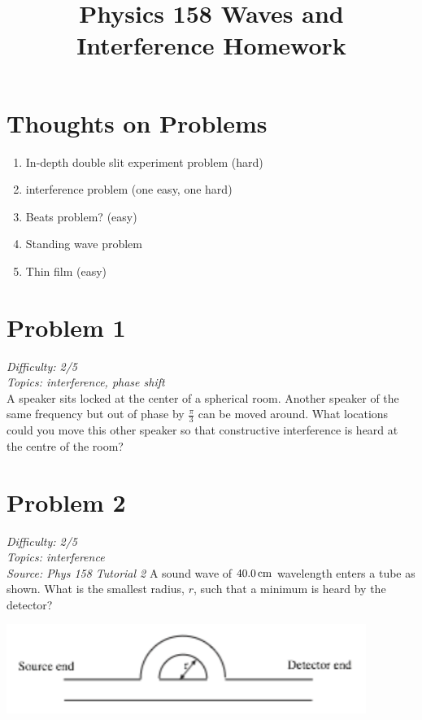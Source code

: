 \documentclass[11pt, fleqn]{article}
\title{Physics 158 Waves and Interference Homework}
\author{}
\date{}
\begin{document}
\allowdisplaybreaks

\maketitle

\section*{Thoughts on Problems}
\begin{enumerate}
    \item In-depth double slit experiment problem (hard)
    \item interference problem (one easy, one hard)
    \item Beats problem? (easy)
    \item Standing wave problem
    \item Thin film (easy)
\end{enumerate}

\section*{Problem 1}
\textit{Difficulty: 2/5}\\
\textit{Topics: interference, phase shift}\\
A speaker sits locked at the center of a spherical room. Another speaker
of the same frequency but out of phase by $\frac{\pi}{3}$ can be moved around. 
What locations could you move this other speaker so that constructive interference is
heard at the centre of the room?

\section*{Problem 2}
\textit{Difficulty: 2/5}\\
\textit{Topics: interference}\\
\textit{Source: Phys 158 Tutorial 2}
A sound wave of $40.0\,\mathrm{cm}$ wavelength enters a tube as shown. What is the
smallest radius, $r$, such that a minimum is heard by the detector?\\
\centerline{\includegraphics{Images/InterferenceTube.png}}
\end{document}

